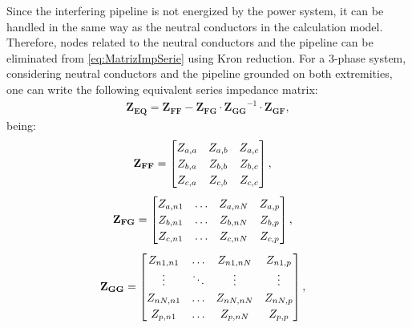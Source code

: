 \documentclass[conference]{IEEEtran}
\begin{document}
	Since the interfering pipeline is not energized by the power system, it can be handled in the same way as the neutral conductors in the calculation model. Therefore, nodes related to the neutral conductors and the pipeline can be eliminated from \eqref{eq:MatrizImpSerie} using Kron reduction. For a 3-phase system, considering neutral conductors and the pipeline grounded on both extremities, one can write the following equivalent series impedance matrix:
	\begin{equation}\label{eq:MatrizZEq}
		\begin{aligned}
			\mathbf{Z_{EQ}}=\mathbf{Z_{FF}}-\mathbf{Z_{FG}}\cdot\mathbf{Z_{GG}}^{-1}\cdot\mathbf{Z_{GF}},
		\end{aligned}
	\end{equation}
	being:
	\begin{equation}\label{eq:MatrizFF}
		\begin{aligned}
			\arraycolsep=0.8pt %
			\medmuskip = -2mu %
			\def\arraystretch{1.2}
			&\mathbf{Z_{FF}}
			=
			\begin{bmatrix}
				Z_{a,a} & Z_{a,b} & Z_{a,c}  \\
				Z_{b,a} & Z_{b,b} & Z_{b,c} \\
				Z_{c,a} & Z_{c,b} & Z_{c,c} \\
			\end{bmatrix},
		\end{aligned}
	\end{equation}
	\begin{equation}\label{eq:MatrizFG}
		\begin{aligned}
			\arraycolsep=0.8pt %
			\medmuskip = -2mu %
			\def\arraystretch{1.2}
			&\mathbf{Z_{FG}}
			=
			\begin{bmatrix}
				Z_{a,n1} & \ldots & Z_{a,nN} & Z_{a,p}  \\
				Z_{b,n1} & \ldots & Z_{b,nN} & Z_{b,p} \\
				Z_{c,n1} & \ldots & Z_{c,nN} & Z_{c,p} \\
			\end{bmatrix}, 
		\end{aligned}
	\end{equation}
	\begin{equation}\label{eq:MatrizGG}
		\begin{aligned}
			\arraycolsep=0.8pt %
			\medmuskip = -2mu %
			\def\arraystretch{1.2}
			&\mathbf{Z_{GG}}
			=
			\begin{bmatrix}
				Z_{n1,n1} & \ldots & Z_{n1,nN} & Z_{n1,p}  \\
				\vdots & \ddots & \vdots & \vdots \\
				Z_{nN,n1} & \ldots & Z_{nN,nN} & Z_{nN,p} \\
				Z_{p,n1} & \ldots & Z_{p,nN} & Z_{p,p} \\
			\end{bmatrix},
		\end{aligned}
	\end{equation}
\end{document}
